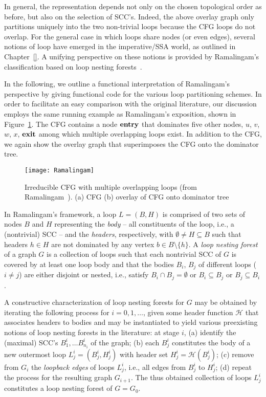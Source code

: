In general, the representation depends not only on the chosen
topological order as before, but also on the selection of SCC's.
Indeed, the above overlay graph only partitions uniquely into the two
non-trivial loops because the CFG loops do not overlap. For the
general case in which loops share nodes (or even edges), several
notions of loop have emerged in the imperative/SSA world, as outlined
in Chapter~\ref{}. A unifying perspective on these notions is provided
by Ramalingam's classification based on loop nesting
forests~\cite{DBLP:journals/toplas/Ramalingam02}.

In the following, we outline a functional interpretation of
Ramalingam's perspective by giving functional code for the various
loop partitioning schemes. In order to facilitate an easy comparison
with the original literature, our discussion employs the same running
example as Ramalingam's exposition, shown in
Figure~\ref{FigLoopAnalysisRamalingamCFG}. The CFG contains a node
$\mathbf{entry}$ that dominates five other nodes, $u$, $v$, $w$, $x$,
$\mathbf{exit}$ among which multiple overlapping loops exist. In addition
to the CFG, we again show the overlay graph that superimposes the CFG
onto the dominator tree.

\begin{figure}
  \begin{center}
    \texttt{[image: Ramalingam]}
  \end{center}
  \caption{\label{FigLoopAnalysisRamalingamCFG} Irreducible CFG with
    multiple overlapping loops (from
    Ramalingam~\cite{DBLP:journals/toplas/Ramalingam02}). 
    (a) CFG (b) overlay of CFG onto dominator tree}
\end{figure}

In Ramalingam's framework, a loop $L = (B,H)$ is comprised of two sets
of nodes $B$ and $H$ representing the \emph{body} -- all constituents
of the loop, i.e., a (nontrivial) SCC -- and the \emph{headers},
respectively, with $\emptyset \neq H \subseteq B$ such that headers $h
\in H$ are not dominated by any vertex $b \in B \setminus \{h\}$. A
\emph{loop nesting forest} of a graph $G$ is a collection of loops
such that each nontrivial SCC of $G$ is covered by at least one loop
body and that the bodies $B_i$, $B_j$ of different loops ($i \neq j$)
are either disjoint or nested, i.e., satisfy $B_i \cap B_j = \emptyset$
or $B_i \subseteq B_j$ or $B_j \subseteq B_i$.

A constructive characterization of loop nesting forests for $G$ may be
obtained by iterating the following process for $i=0,1,\ldots$, given
some header function $\mathcal{H}$ that associates headers to bodies
and may be instantiated to yield various preexisting notions of loop
nesting forests in the literature: at stage $i$, (a) identify the
(maximal) SCC's $B^i_1, \ldots B^i_{n_i}$ of the graph; (b) each
$B^i_j$ constitutes the body of a new outermost loop $L^i_j = (B^i_j,
H^i_j)$ with header set $H^i_j = \mathcal{H}(B^i_j)$; (c) remove from
$G_i$ the \emph{loopback edges} of loops $L^i_j$, i.e., all edges from
$B^i_j$ to $H^i_j$; (d) repeat the process for the resulting graph
$G_{i+1}$. The thus obtained collection of loops $L^i_j$ constitutes a
loop nesting forest of $G = G_0$.

